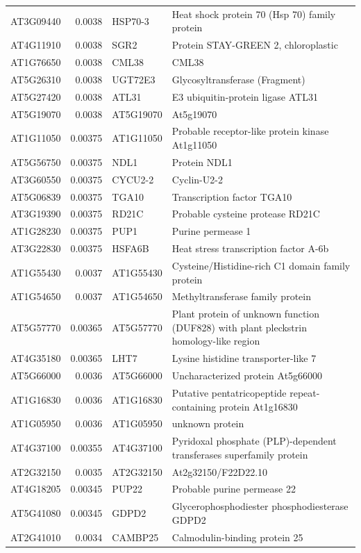 \documentclass[11pt]{article}
\begin{document}
\begin{center}
\begin{tabular}{lrll}
AT3G09440 & 0.0038 & HSP70-3 & Heat shock protein 70 (Hsp 70) family protein\\
AT4G11910 & 0.0038 & SGR2 & Protein STAY-GREEN 2, chloroplastic\\
AT1G76650 & 0.0038 & CML38 & CML38\\
AT5G26310 & 0.0038 & UGT72E3 & Glycosyltransferase (Fragment)\\
AT5G27420 & 0.0038 & ATL31 & E3 ubiquitin-protein ligase ATL31\\
AT5G19070 & 0.0038 & AT5G19070 & At5g19070\\
AT1G11050 & 0.00375 & AT1G11050 & Probable receptor-like protein kinase At1g11050\\
AT5G56750 & 0.00375 & NDL1 & Protein NDL1\\
AT3G60550 & 0.00375 & CYCU2-2 & Cyclin-U2-2\\
AT5G06839 & 0.00375 & TGA10 & Transcription factor TGA10\\
AT3G19390 & 0.00375 & RD21C & Probable cysteine protease RD21C\\
AT1G28230 & 0.00375 & PUP1 & Purine permease 1\\
AT3G22830 & 0.00375 & HSFA6B & Heat stress transcription factor A-6b\\
AT1G55430 & 0.0037 & AT1G55430 & Cysteine/Histidine-rich C1 domain family protein\\
AT1G54650 & 0.0037 & AT1G54650 & Methyltransferase family protein\\
AT5G57770 & 0.00365 & AT5G57770 & Plant protein of unknown function (DUF828) with plant pleckstrin homology-like region\\
AT4G35180 & 0.00365 & LHT7 & Lysine histidine transporter-like 7\\
AT5G66000 & 0.0036 & AT5G66000 & Uncharacterized protein At5g66000\\
AT1G16830 & 0.0036 & AT1G16830 & Putative pentatricopeptide repeat-containing protein At1g16830\\
AT1G05950 & 0.0036 & AT1G05950 & unknown protein\\
AT4G37100 & 0.00355 & AT4G37100 & Pyridoxal phosphate (PLP)-dependent transferases superfamily protein\\
AT2G32150 & 0.0035 & AT2G32150 & At2g32150/F22D22.10\\
AT4G18205 & 0.00345 & PUP22 & Probable purine permease 22\\
AT5G41080 & 0.00345 & GDPD2 & Glycerophosphodiester phosphodiesterase GDPD2\\
AT2G41010 & 0.0034 & CAMBP25 & Calmodulin-binding protein 25\\

\end{tabular}
\end{center}
\end{document}
